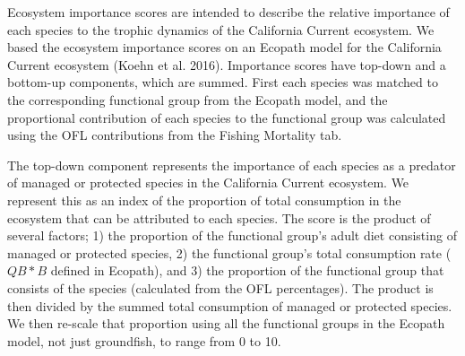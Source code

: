 \documentclass[11pt,
  english,
  a4paper,
]{article}
\begin{document}

Ecosystem importance scores are intended to describe the relative importance of each species to the trophic dynamics of the California Current ecosystem. We based the ecosystem importance scores on an Ecopath model for the California Current ecosystem {(Koehn et al. 2016)\leavevmode\tagmcend\tagstructend}. Importance scores have top-down and a bottom-up components, which are summed. First each species was matched to the corresponding functional group from the Ecopath model, and the proportional contribution of each species to the functional group was calculated using the OFL contributions from the Fishing Mortality tab.

\leavevmode\tagmcend\tagstructend\par


The top-down component represents the importance of each species as a predator of managed or protected species in the California Current ecosystem. We represent this as an index of the proportion of total consumption in the ecosystem that can be attributed to each species. The score is the product of several factors; 1) the proportion of the functional group's adult diet consisting of managed or protected species, 2) the functional group's total consumption rate ({\(QB*B\)\leavevmode\tagmcend\tagstructend} defined in Ecopath), and 3) the proportion of the functional group that consists of the species (calculated from the OFL percentages). The product is then divided by the summed total consumption of managed or protected species. We then re-scale that proportion using all the functional groups in the Ecopath model, not just groundfish, to range from 0 to 10.

\leavevmode\tagmcend\tagstructend\par

\end{document}
